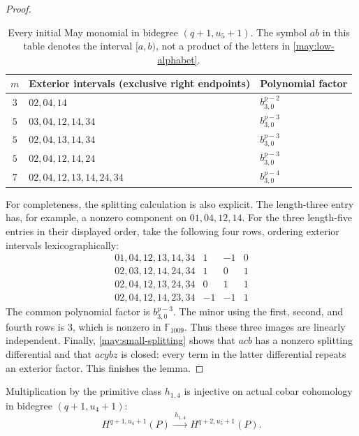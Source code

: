\begin{proof}
\begin{table}[htbp]
\centering
\begin{tabular}{c l l}
\toprule
$m$ & Exterior intervals (exclusive right endpoints) & Polynomial factor\\
\midrule
$3$ & $02,04,14$ & $b_{3,0}^{p-2}$\\
$5$ & $03,04,12,14,34$ & $b_{3,0}^{p-3}$\\
$5$ & $02,04,13,14,34$ & $b_{3,0}^{p-3}$\\
$5$ & $02,04,12,14,24$ & $b_{3,0}^{p-3}$\\
$7$ & $02,04,12,13,14,24,34$ & $b_{3,0}^{p-4}$\\
\bottomrule
\end{tabular}
\caption{Every initial May monomial in bidegree $(q+1,u_5+1)$.
The symbol $ab$ in this table denotes the interval $[a,b)$, not a
product of the letters in \eqref{may:low-alphabet}.}
\label{may:n5-table}
\end{table}

For completeness, the splitting calculation is also explicit.
The length-three entry has, for example, a nonzero component on
$01,04,12,14$.  For the three length-five entries in their displayed
order, take the following four rows, ordering exterior intervals
lexicographically:
\[
\begin{array}{c|rrr}
01,04,12,13,14,34&1&-1&0\\
02,03,12,14,24,34&1&0&1\\
02,04,12,13,24,34&0&1&1\\
02,04,12,14,23,34&-1&-1&1
\end{array}
\]
The common polynomial factor is $b_{3,0}^{p-3}$.  The minor using the
first, second, and fourth rows is $3$, which is nonzero in
$\mathbb F_{1009}$.  Thus these three images are linearly independent.
Finally, \eqref{may:small-splitting} shows that $acb$ has a nonzero
splitting differential and that $acybz$ is closed: every term in the
latter differential repeats an exterior factor.  This finishes the
lemma.
\end{proof}

\begin{proposition}
\label{may:injectivity}
Multiplication by the primitive class $h_{1,4}$ is injective on actual
cobar cohomology in bidegree $(q+1,u_4+1)$:
\[
 H^{q+1,u_4+1}(P)\xrightarrow{\ h_{1,4}\ }
 H^{q+2,u_5+1}(P).
\]
\end{proposition}

